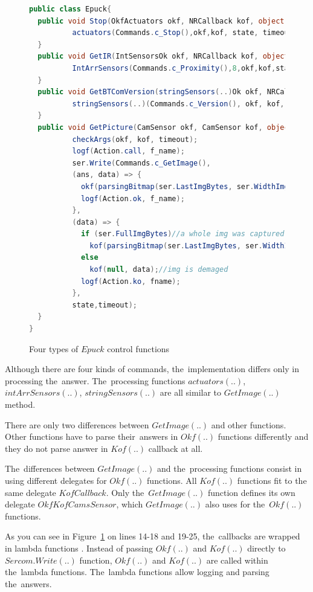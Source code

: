 \begin{figure}[!hbp]
\begin{lstlisting}[language=cs]
public class Epuck{
  public void Stop(OkfActuators okf, NRCallback kof, object state, double timeout) {
          actuators(Commands.c_Stop(),okf,kof, state, timeout, "Stop(..)");
  }
  public void GetIR(IntSensorsOk okf, NRCallback kof, object state, double timeout) {
          IntArrSensors(Commands.c_Proximity(),8,okf,kof,state,timeout,"GetIR(..)");
  }
  public void GetBTComVersion(stringSensors(..)Ok okf, NRCallback kof, object state, double timeout) {
          stringSensors(..)(Commands.c_Version(), okf, kof, state, timeout, "BTComVersion(..)");
  }
  public void GetPicture(CamSensor okf, CamSensor kof, object state, double timeout) {
          checkArgs(okf, kof, timeout);
          logf(Action.call, f_name);
          ser.Write(Commands.c_GetImage(),
          (ans, data) => {
            okf(parsingBitmap(ser.LastImgBytes, ser.WidthImg, ser.HeightImg, ser.ModeImg), data);
            logf(Action.ok, f_name);
          },
          (data) => {
            if (ser.FullImgBytes)//a whole img was captured
              kof(parsingBitmap(ser.LastImgBytes, ser.WidthImg, ser.HeightImg, ser.ModeImg), data);
            else
              kof(null, data);//img is demaged
            logf(Action.ko, fname);
          },
          state,timeout);		
  }	   
}
\end{lstlisting}
\caption{Four types of $Epuck$ control functions}
\label{publicep}	
\end{figure}

  Although there are four kinds of commands, the~implementation differs only in processing the~answer.
  The~processing functions $actuators(..)$, $intArrSensors(..)$, $stringSensors(..)$ are all similar to $GetImage(..)$ method.
  
  There are only two differences between $GetImage(..)$ and other functions.
  Other functions have to parse their~answers in $Okf(..)$ functions differently and they do not parse
  answer in $Kof(..)$ callback at all.

  The~differences between $GetImage(..)$ and the~processing functions consist in using different
  delegates for $Okf(..)$ functions. All $Kof(..)$ functions fit to the same delegate $KofCallback$. 
  Only the~$GetImage(..)$ function defines its own delegate $OkfKofCamsSensor$, 
  which $GetImage(..)$ also uses for the~$Okf(..)$ functions.
  
  \begin{remark}
  As you can see in Figure~\ref{publicep} on lines 14-18 and 19-25,
  the~callbacks are wrapped in lambda functions \cite{lambda}.
  Instead of passing $Okf(..)$ and $Kof(..)$ directly to $Sercom.Write(..)$ function,
  $Okf(..)$ and $Kof(..)$  are called within the~lambda functions.
  The~lambda functions allow logging and parsing the~answers.
  \end{remark}


